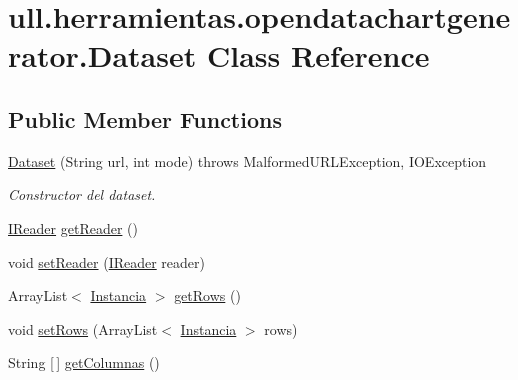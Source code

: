 \hypertarget{classull_1_1herramientas_1_1opendatachartgenerator_1_1_dataset}{}\section{ull.\+herramientas.\+opendatachartgenerator.\+Dataset Class Reference}
\label{classull_1_1herramientas_1_1opendatachartgenerator_1_1_dataset}
\subsection*{Public Member Functions}
\begin{DoxyCompactItemize}
\item 
\mbox{\hyperlink{classull_1_1herramientas_1_1opendatachartgenerator_1_1_dataset_a072582f59ed98fb752261920a684441c}{Dataset}} (String url, int mode)  throws Malformed\+U\+R\+L\+Exception, I\+O\+Exception 	
\begin{DoxyCompactList}\small\item\em Constructor del dataset. \end{DoxyCompactList}\item 
\mbox{\hyperlink{classull_1_1herramientas_1_1opendatachartgenerator_1_1_i_reader}{I\+Reader}} \mbox{\hyperlink{classull_1_1herramientas_1_1opendatachartgenerator_1_1_dataset_a108bc150d3c0505b91022cccd04238e1}{get\+Reader}} ()
\item 
void \mbox{\hyperlink{classull_1_1herramientas_1_1opendatachartgenerator_1_1_dataset_a39f09ea187d8518a773a17ecbe6b4b6b}{set\+Reader}} (\mbox{\hyperlink{classull_1_1herramientas_1_1opendatachartgenerator_1_1_i_reader}{I\+Reader}} reader)
\item 
Array\+List$<$ \mbox{\hyperlink{classull_1_1herramientas_1_1opendatachartgenerator_1_1_instancia}{Instancia}} $>$ \mbox{\hyperlink{classull_1_1herramientas_1_1opendatachartgenerator_1_1_dataset_acc64100fc6924fc988828bfb10121fdd}{get\+Rows}} ()
\item 
void \mbox{\hyperlink{classull_1_1herramientas_1_1opendatachartgenerator_1_1_dataset_a2dfc0af3a5e9c6e6b2d6bde97bc0981c}{set\+Rows}} (Array\+List$<$ \mbox{\hyperlink{classull_1_1herramientas_1_1opendatachartgenerator_1_1_instancia}{Instancia}} $>$ rows)
\item 
String \mbox{[}$\,$\mbox{]} \mbox{\hyperlink{classull_1_1herramientas_1_1opendatachartgenerator_1_1_dataset_af9ee7ea6ec6e21192d958d01c97af701}{get\+Columnas}} ()
\item 

\end{DoxyCompactItemize}
